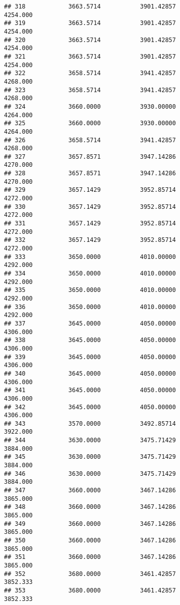 \documentclass[]{article}
\begin{document}
\begin{verbatim}
## 318            3663.5714           3901.42857                4254.000
## 319            3663.5714           3901.42857                4254.000
## 320            3663.5714           3901.42857                4254.000
## 321            3663.5714           3901.42857                4254.000
## 322            3658.5714           3941.42857                4268.000
## 323            3658.5714           3941.42857                4268.000
## 324            3660.0000           3930.00000                4264.000
## 325            3660.0000           3930.00000                4264.000
## 326            3658.5714           3941.42857                4268.000
## 327            3657.8571           3947.14286                4270.000
## 328            3657.8571           3947.14286                4270.000
## 329            3657.1429           3952.85714                4272.000
## 330            3657.1429           3952.85714                4272.000
## 331            3657.1429           3952.85714                4272.000
## 332            3657.1429           3952.85714                4272.000
## 333            3650.0000           4010.00000                4292.000
## 334            3650.0000           4010.00000                4292.000
## 335            3650.0000           4010.00000                4292.000
## 336            3650.0000           4010.00000                4292.000
## 337            3645.0000           4050.00000                4306.000
## 338            3645.0000           4050.00000                4306.000
## 339            3645.0000           4050.00000                4306.000
## 340            3645.0000           4050.00000                4306.000
## 341            3645.0000           4050.00000                4306.000
## 342            3645.0000           4050.00000                4306.000
## 343            3570.0000           3492.85714                3922.000
## 344            3630.0000           3475.71429                3884.000
## 345            3630.0000           3475.71429                3884.000
## 346            3630.0000           3475.71429                3884.000
## 347            3660.0000           3467.14286                3865.000
## 348            3660.0000           3467.14286                3865.000
## 349            3660.0000           3467.14286                3865.000
## 350            3660.0000           3467.14286                3865.000
## 351            3660.0000           3467.14286                3865.000
## 352            3680.0000           3461.42857                3852.333
## 353            3680.0000           3461.42857                3852.333

\end{verbatim}
\end{document}
